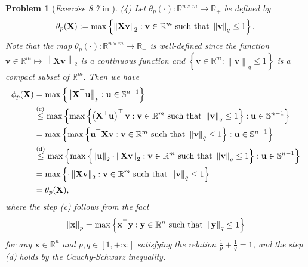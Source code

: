 \documentclass[11pt]{article}
\newtheorem{problem}{Problem}
\numberwithin{equation}{problem}
\begin{document}
\begin{problem} [\emph{Exercise 8.7} in \cite{calafiore2014optimization}]
{\indent (4) Let $\theta_p (\cdot) : \mathbb{R}^{n \times m} \rightarrow \mathbb{R}_{+}$ be defined by
\begin{equation}
    \label{eqn2.8}
    \theta_p (\mathbf{X}) := \max \left\{ \left\| \mathbf{X} \mathbf{v} \right\|_2 : \mathbf{v} \in \mathbb{R}^m \textnormal{ such that } \left\| \mathbf{v} \right\|_q \leq 1 \right\}.
\end{equation}
Note that the map $\theta_p (\cdot) : \mathbb{R}^{n \times m} \rightarrow \mathbb{R}_{+}$ is well-defined since the function $\mathbf{v} \in \mathbb{R}^m \mapsto \left\| \mathbf{X} \mathbf{v} \right\|_2$ is a continuous function and $\left\{ \mathbf{v} \in \mathbb{R}^m: \left\| \mathbf{v} \right\|_q \leq 1 \right\}$ is a compact subset of $\mathbb{R}^m$. Then we have
\begin{equation}
    \label{eqn2.9}
    \begin{split}
        \phi_p (\mathbf{X}) &= \max \left\{ \left\| \mathbf{X}^{\top} \mathbf{u} \right\|_p : \mathbf{u} \in \mathbb{S}^{n-1} \right\} \\
        &\stackrel{\textnormal{(c)}}{\leq} \max \left\{ \max \left\{ \left( \mathbf{X}^{\top} \mathbf{u} \right)^{\top} \mathbf{v} : \mathbf{v} \in \mathbb{R}^m \textnormal{ such that } \left\| \mathbf{v} \right\|_q \leq 1 \right\} : \mathbf{u} \in \mathbb{S}^{n-1} \right\} \\
        &= \max \left\{ \max \left\{ \mathbf{u}^{\top} \mathbf{X} \mathbf{v} : \mathbf{v} \in \mathbb{R}^m \textnormal{ such that } \left\| \mathbf{v} \right\|_q \leq 1 \right\} : \mathbf{u} \in \mathbb{S}^{n-1} \right\} \\
        &\stackrel{\textnormal{(d)}}{\leq} \max \left\{ \max \left\{ \left\| \mathbf{u} \right\|_2 \cdot \left\| \mathbf{Xv} \right\|_2 : \mathbf{v} \in \mathbb{R}^m \textnormal{ such that } \left\| \mathbf{v} \right\|_q \leq 1 \right\} : \mathbf{u} \in \mathbb{S}^{n-1} \right\} \\
        &= \max \left\{ \cdot \left\| \mathbf{Xv} \right\|_2 : \mathbf{v} \in \mathbb{R}^m \textnormal{ such that } \left\| \mathbf{v} \right\|_q \leq 1 \right\} \\
        &= \theta_p (\mathbf{X}),
    \end{split}
\end{equation}
where the step (c) follows from the fact
\begin{equation}
    \label{eqn2.10}
    \left\| \mathbf{x} \right\|_p = \max \left\{ \mathbf{x}^{\top} \mathbf{y} : \mathbf{y} \in \mathbb{R}^n \textnormal{ such that } \left\| \mathbf{y} \right\|_q \leq 1 \right\}
\end{equation}
for any $\mathbf{x} \in \mathbb{R}^n$ and $p, q \in \left[ 1, +\infty \right]$ satisfying the relation $\frac{1}{p} + \frac{1}{q} = 1$, and the step (d) holds by the Cauchy-Schwarz inequality. 
\medskip

}
\end{problem}
\end{document}

